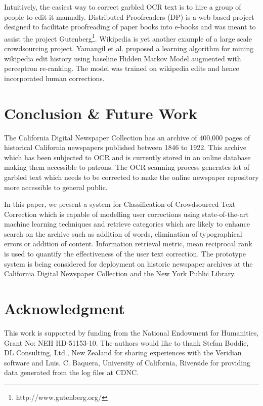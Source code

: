 \documentclass{sig-alternate}
\begin{document}
Intuitively, the easiest way to correct garbled OCR text is to hire a group of people to edit it manually. Distributed Proofreaders (DP) \cite{DP} is a web-based project designed to facilitate proofreading of paper books into e-books and was meant to assist the project Gutenberg\footnote{http://www.gutenberg.org/}. Wikipedia is yet another example of a large scale crowdsourcing project. Yamangil et al. \cite{wikiedits} proposed a learning algorithm for mining wikipedia edit history using baseline Hidden Markov Model augmented with perceptron re-ranking. The model was trained on wikipedia edits and hence incorporated human corrections. 



\section{Conclusion \& Future Work}
\label{sec:conc}
The California Digital Newspaper Collection has an archive of 400,000 pages of historical California newspapers published between 1846 to 1922. This archive which has been subjected to OCR and is currently stored in an online database making them accessible to patrons. The OCR scanning process generates lot of garbled text which needs to be corrected to make the online newspaper repository more accessible to general public. 

In this paper, we present a system for Classification of Crowdsourced Text Correction which is capable of modelling user corrections using state-of-the-art machine learning techniques and retrieve categories which are likely to enhance search on the archive such as addition of words, elimination of typographical errors or addition of content. Information retrieval metric, mean reciprocal rank is used to quantify the effectiveness of the user text correction. The prototype system is being considered for deployment on historic newspaper archives at the California Digital Newspaper Collection and the New York Public Library.

\section*{Acknowledgment}
This work is supported by funding from the National Endowment for Humanities, Grant No: NEH HD-51153-10. The authors would like to thank Stefan Boddie, DL Consulting, Ltd., New Zealand for sharing experiences with the Veridian software and Luis. C. Baquera, University of California, Riverside for providing data generated from the log files at CDNC.\\

%
%
%


\end{document}
